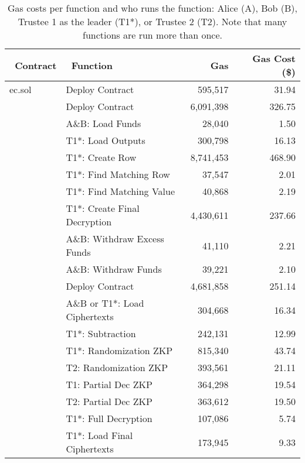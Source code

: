 \begin{table}[t]
		\centering
	\begin{tabular}{|l|l|r|r|}
		\hline
		~\textbf{Contract} & ~\textbf{Function } & ~\textbf{Gas}  & ~\textbf{Gas Cost (\$)}  \\ \hline
			ec.sol	& Deploy Contract &595,517 & 31.94 \\ \hline

		\multirow{8}{*}{}  
		& Deploy Contract &6,091,398 & 326.75 \\ \cline{2-4} 
		& A\&B: Load Funds & 28,040  &1.50  \\ \cline{2-4} 
		& T1*: Load Outputs&  300,798 & 16.13 \\  \cline{2-4} 
		& T1*: Create Row & 8,741,453 & 468.90 \\  \cline{2-4}
		Mixmatch.sol 	& T1*: Find Matching Row & 37,547 &2.01  \\  \cline{2-4}
		(Absentia DApp)& T1*: Find Matching Value &  40,868&2.19 \\  \cline{2-4}
		& T1*:  Create Final Decryption&  4,430,611& 237.66 \\  \cline{2-4}
		& A\&B: Withdraw Excess Funds &  41,110& 2.21 \\  \cline{2-4}
		&  A\&B:  Withdraw Funds&  39,221& 2.10 \\   \hline
		\multirow{8}{*}{} 
		& Deploy Contract & 4,681,858&251.14 \\ \cline{2-4} 
		&   A\&B or T1*: Load Ciphertexts & 304,668 & 16.34 \\  \cline{2-4}
		& T1*: Subtraction & 242,131 & 12.99\\  \cline{2-4}
		& T1*: Randomization ZKP& 815,340 &  43.74\\  \cline{2-4}
		PET.sol	&  T2: Randomization ZKP& 393,561 &21.11  \\  \cline{2-4}
		(PET Sub-DApp) & T1: Partial Dec ZKP& 364,298 & 19.54\\  \cline{2-4}
		& T2: Partial Dec ZKP & 363,612 & 19.50 \\  \cline{2-4}
		& T1*: Full Decryption  &  107,086& 5.74 \\  \cline{2-4}
		& T1*:  Load Final Ciphertexts& 173,945 & 9.33\\ \hline
		\cline{1-4}
	\end{tabular}
	\caption{Gas costs per function and who runs the function: Alice (A), Bob (B), Trustee 1 as the leader (T1*), or Trustee 2 (T2). Note that many functions are run more than once.}
	 \label{tab:gascost}
\end{table}
